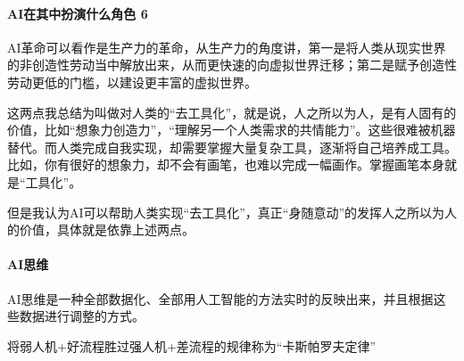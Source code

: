 \documentclass[letterpaper,11pt,english]{sphinxmanual}
\begin{document}
\paragraph{AI在其中扮演什么角色 6\sphinxfootnotemark[186]}
\label{\detokenize{chapter_introduction/AI:ai-6}}%
\begin{footnotetext}[186]\sphinxAtStartFootnote
{}
%
\end{footnotetext}\ignorespaces 
AI革命可以看作是生产力的革命，从生产力的角度讲，第一是将人类从现实世界的非创造性劳动当中解放出来，从而更快速的向虚拟世界迁移；第二是赋予创造性劳动更低的门槛，以建设更丰富的虚拟世界。

这两点我总结为叫做对人类的“去工具化”，就是说，人之所以为人，是有人固有的价值，比如“想象力创造力”，“理解另一个人类需求的共情能力”。这些很难被机器替代。而人类完成自我实现，却需要掌握大量复杂工具，逐渐将自己培养成工具。比如，你有很好的想象力，却不会有画笔，也难以完成一幅画作。掌握画笔本身就是“工具化”。

但是我认为AI可以帮助人类实现“去工具化”，真正“身随意动”的发挥人之所以为人的价值，具体就是依靠上述两点。


\paragraph{AI思维}
\label{\detokenize{chapter_introduction/AI:id14}}
AI思维是一种全部数据化、全部用人工智能的方法实时的反映出来，并且根据这些数据进行调整的方式。%
\begin{footnote}[187]\sphinxAtStartFootnote
{}
%
\end{footnote}

将弱人机+好流程胜过强人机+差流程的规律称为“卡斯帕罗夫定律”%
\begin{footnote}[188]\sphinxAtStartFootnote
{}
%
\end{footnote}
\end{document}

